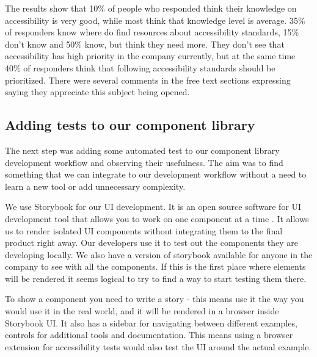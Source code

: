 \documentclass{master_thesis}
\begin{document}
The results show that 10\% of people who responded think their knowledge on accessibility is very good, while most think that knowledge level is average. 35\% of responders know where do find resources about accessibility standards, 15\% don't know and 50\% know, but think they need more. They don't see that accessibility has high priority in the company currently, but at the same time 40\% of responders think that following accessibility standards should be prioritized. There were several comments in the free text sections expressing saying they appreciate this subject being opened.

\subsection{Adding tests to our component library}
The next step was adding some automated test to our component library development workflow and observing their usefulness. The aim was to find something that we can integrate to our development workflow without a need to learn a new tool or add unnecessary complexity.

We use Storybook for our UI development. It is an open source software for UI development tool that allows you to work on one component at a time \citep{storybook}. It allows us to render isolated UI components without integrating them to the final product right away. Our developers use it to test out the components they are developing locally. We also have a version of storybook available for anyone in the company to see with all the components. If this is the first place where elements will be rendered it seems logical to try to find a way to start testing them there.

To show a component you need to write a story - this means use it the way you would use it in the real world, and it will be rendered in a browser inside Storybook UI. It also has a sidebar for navigating between different examples, controls for additional tools and documentation. This means using a browser extension for accessibility tests would also test the UI around the actual example.
\end{document}
